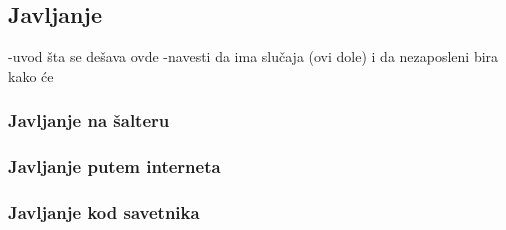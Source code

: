\subsection{Javljanje}

-uvod \v sta se de\v sava ovde
-navesti da ima slu\v caja (ovi dole) i da nezaposleni bira kako \' ce

\subsubsection{Javljanje na \v salteru}

\subsubsection{Javljanje putem interneta}

\subsubsection{Javljanje kod savetnika}